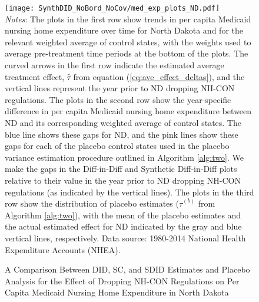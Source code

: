 \documentclass[../Main.tex]{subfiles}
\begin{document}
\newpage
{}
\begin{figure}[t] 
    \setlength{}
	\caption{\label{fig:med_exp_plots_nd} \centering A Comparison Between DID, SC, and SDID Estimates and Placebo Analysis for the Effect of Dropping NH-CON Regulations on Per Capita Medicaid Nursing Home Expenditure in North Dakota} {\centering\texttt{[image: SynthDID\_NoBord\_NoCov/med\_exp\_plots\_ND.pdf]}}
    \vspace{-1.4cm}\\
    \scriptsize
		\textit{Notes}: The plots in the first row show trends in per capita Medicaid nursing home expenditure over time for North Dakota and for the relevant weighted average of control states, with the weights used to average pre-treatment time periods at the bottom of the plots. The curved arrows in the first row indicate the estimated average treatment effect, $\hat{\tau}$ from equation (\ref{eq:ave_effect_deltas}), and the vertical lines represent the year prior to ND dropping NH-CON regulations. The plots in the second row show the year-specific difference in per capita Medicaid nursing home expenditure between ND and its corresponding weighted average of control states. The blue line shows these gaps for ND, and the pink lines show these gaps for each of the placebo control states used in the placebo variance estimation procedure outlined in Algorithm \ref{alg:two}. We make the gaps in the Diff-in-Diff and Synthetic Diff-in-Diff plots relative to their value in the year prior to ND dropping NH-CON regulations (as indicated by the vertical lines). The plots in the third row show the distribution of placebo estimates ($\hat{\tau}^{(b)}$ from Algorithm \ref{alg:two}), with the mean of the placebo estimates and the actual estimated effect for ND indicated by the gray and blue vertical lines, respectively. Data source: 1980-2014 National Health Expenditure Accounts (NHEA).
\end{figure}
\restoregeometry
\clearpage
\end{document}
